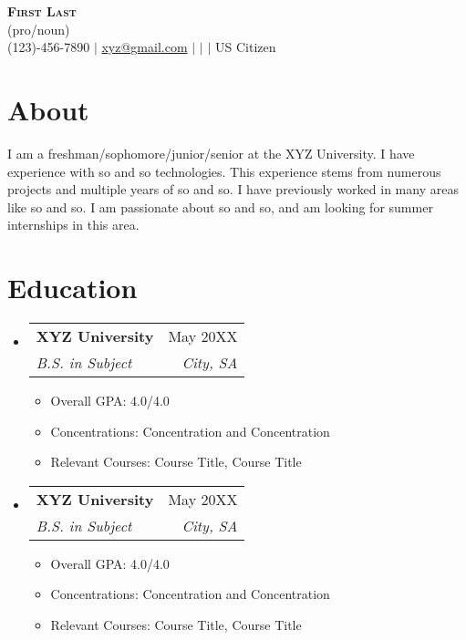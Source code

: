 \documentclass[letterpaper,11pt]{article}
\makeatletter
\newcommand{\resumeItem}[1]{
  \item\small{
    {#1 \vspace{-2pt}}
  }
}
\newcommand{\resumeSubheading}[4]{
  \vspace{-2pt}\item
    \begin{tabular*}{0.97\textwidth}[t]{l@{\extracolsep{\fill}}r}
      \textbf{#1} & #2 \\
      \textit{\small#3} & \textit{\small #4} \\
    \end{tabular*}\vspace{-7pt}
}
\newcommand{\resumeSubHeadingListStart}{\begin{itemize}[leftmargin=0.15in, label={}]}
\newcommand{\resumeSubHeadingListEnd}{\end{itemize}}
\newcommand{\resumeItemListStart}{\begin{itemize}}
\newcommand{\resumeItemListEnd}{\end{itemize}\vspace{-5pt}}
\makeatother
\begin{document}

\begin{center}
    \textbf{\Huge \scshape First Last} \\ \vspace{1pt} \footnotesize (pro/noun) \\ \vspace{5pt}
    \small {\faPhone\hspace{0.5em}(123)-456-7890} $|$ \href{mailto:xyz@gmail.com}{\faEnvelope\hspace{0.5em}xyz@gmail.com} $|$ 
    \href{https://linkedin.com/in/first-last}{\faLinkedinSquare\hspace{0.5em}{first-last}}
 $|$
    \href{https://github.com/first-last}{\faGithub\hspace{0.5em}{first-last}} $|$ {\faHome\hspace{0.5em}US Citizen}
\end{center}

\section{About}
\leftskip=10pt
\small{ I am a freshman/sophomore/junior/senior at the XYZ University. I have experience with so and so technologies. This experience stems from numerous projects and multiple years of so and so. I have previously worked in many areas like so and so. I am passionate about so and so, and am looking for summer internships in this area.}

\section{Education}
  \resumeSubHeadingListStart
    \resumeSubheading
      {XYZ University}{May 20XX}
      {B.S. in Subject} {City, SA}
  \resumeItemListStart
    \resumeItem{Overall GPA: 4.0/4.0}
    \resumeItem{Concentrations: Concentration and Concentration}
    \resumeItem{Relevant Courses: Course Title, Course Title}
  \resumeItemListEnd
  \resumeSubheading
      {XYZ University}{May 20XX}
      {B.S. in Subject} {City, SA}
  \resumeItemListStart
    \resumeItem{Overall GPA: 4.0/4.0}
    \resumeItem{Concentrations: Concentration and Concentration}
    \resumeItem{Relevant Courses: Course Title, Course Title}
  \resumeItemListEnd
  \resumeSubHeadingListEnd
\end{document}
